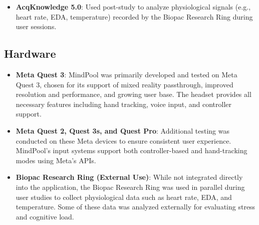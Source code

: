 \documentclass{CPP}
\begin{document}
\begin{itemize}

    \item \textbf{AcqKnowledge 5.0}: Used post-study to analyze physiological signals (e.g., heart rate, EDA, temperature) recorded by the Biopac Research Ring during user sessions.

    
\end{itemize}

\subsection{Hardware}

\begin{itemize}
    \item \textbf{Meta Quest 3}: MindPool was primarily developed and tested on Meta Quest 3, chosen for its support of mixed reality passthrough, improved resolution and performance, and growing user base. The headset provides all necessary features including hand tracking, voice input, and controller support.
    
    \item \textbf{Meta Quest 2, Quest 3s, and Quest Pro}: Additional testing was conducted on these Meta devices to ensure consistent user experience. MindPool’s input systems support both controller-based and hand-tracking modes using Meta’s APIs.

    \item \textbf{Biopac Research Ring (External Use)}: While not integrated directly into the application, the Biopac Research Ring was used in parallel during user studies to collect physiological data such as heart rate, EDA, and temperature. Some of these data was analyzed externally for evaluating stress and cognitive load.
\end{itemize}



\end{document}
